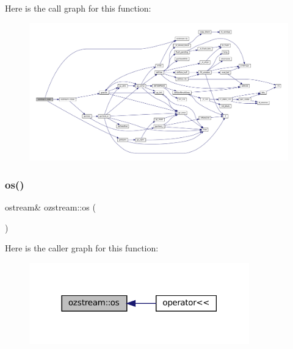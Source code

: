 Here is the call graph for this function\+:
\nopagebreak
\begin{figure}[H]
\begin{center}
\leavevmode
\includegraphics[width=350pt]{classozstream_aa5ccfff4546c31dd1f9cd78ad02d446f_cgraph}
\end{center}
\end{figure}
\mbox{\label{classozstream_acbbb07b71280b24534fc6e0ca8366ae2}} 
\subsubsection{\texorpdfstring{os()}{os()}}
{\footnotesize\ttfamily ostream\& ozstream\+::os (\begin{DoxyParamCaption}{ }\end{DoxyParamCaption})\hspace{0.3cm}{\ttfamily [inline]}}

Here is the caller graph for this function\+:
\nopagebreak
\begin{figure}[H]
\begin{center}
\leavevmode
\includegraphics[width=270pt]{classozstream_acbbb07b71280b24534fc6e0ca8366ae2_icgraph}
\end{center}
\end{figure}
\mbox{\label{classozstream_aa65b61b59ad9d43f3f35095cb353f57f}} 
